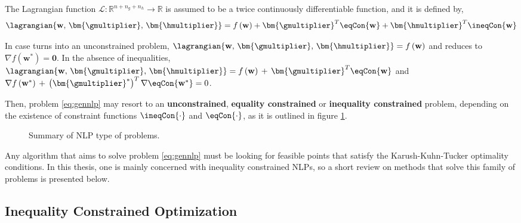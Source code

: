 \begin{definition}
The Lagrangian function $\mathcal{L}: \mathbb{R}^{n + n_g + n_h} \to \mathbb{R}$ is assumed to be a twice continuously differentiable function, and it is defined by,
\begin{equation}
\lagrangian{\mathbf{w},\,\bm{\gmultiplier},\,\bm{\hmultiplier}} = f\left(\mathbf{w}\right) + \bm{\gmultiplier}^T \eqCon{\mathbf{w}} + \bm{\hmultiplier}^T \ineqCon{\mathbf{w}}
\label{eq:lagrangianfunc}
\end{equation} 
\end{definition}
\begin{remark}
In case  turns into an unconstrained problem, $\lagrangian{\mathbf{w},\,\bm{\gmultiplier},\,\bm{\hmultiplier}} = f\left(\mathbf{w}\right)$ and  reduces to $\nabla f\left(\mathbf{w}^*\right) = \mathbf{0}$. In the absence of inequalities, $\lagrangian{\mathbf{w},\,\bm{\gmultiplier},\,\bm{\hmultiplier}} = f\left(\mathbf{w}\right) \, + \, \bm{\gmultiplier}^T \eqCon{\mathbf{w}}$ and $\nabla f\left(\mathbf{w}^*\right) \, + \, \left(\bm{\gmultiplier}^*\right)^T \nabla\eqCon{\mathbf{w}^*} = 0$.
\end{remark}
Then, problem \eqref{eq:gennlp} may resort to an \textbf{unconstrained}, \textbf{equality constrained} or \textbf{inequality constrained} problem, depending on the existence of constraint functions $\ineqCon{\cdot}$ and $\eqCon{\cdot}$, as it is outlined in figure \ref{fig:nlptypeprob}.

\begin{figure}[h]
\centering
{}
\caption{Summary of NLP type of problems.}
\label{fig:nlptypeprob}
\end{figure}

Any algorithm that aims to solve problem \eqref{eq:gennlp} must be looking for feasible points that satisfy the Karush-Kuhn-Tucker optimality conditions. In this thesis, one is mainly concerned with inequality constrained NLPs, so a short review on methods that solve this family of problems is presented below.

\subsection*{Inequality Constrained Optimization}
\label{subsection:ineqconopt}

